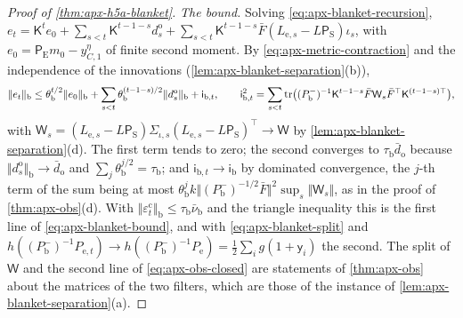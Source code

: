 \begin{proof}[Proof of \cref{thm:apx-h5a-blanket}]
\emph{The bound.} Solving \eqref{eq:apx-blanket-recursion}, $e_t=\mathsf K^te_0+\sum_{s<t}\mathsf K^{t-1-s}d^{\mathrm o}_s+\sum_{s<t}\mathsf K^{t-1-s}\bar F(L_{\mathrm e,s}-L\mathsf P_{\mathrm S})\iota_s$, with $e_0=\mathsf P_{\mathrm E}m_0-y^\eta_{C,1}$ of finite second moment. By \cref{eq:apx-metric-contraction} and the independence of the innovations (\cref{lem:apx-blanket-separation}(b)),
\begin{equation*}
\Vert e_t\Vert_{\mathrm b}\le\theta_{\mathrm b}^{t/2}\Vert e_0\Vert_{\mathrm b}+\sum_{s<t}\theta_{\mathrm b}^{(t-1-s)/2}\Vert d^{\mathrm o}_s\Vert_{\mathrm b}+\mathsf i_{\mathrm b,t},\qquad\mathsf i_{\mathrm b,t}^2=\sum_{s<t}\operatorname{tr}\bigl((P^-_{\mathrm b})^{-1}\mathsf K^{t-1-s}\bar F\mathsf W_s\bar F^\top\mathsf K^{(t-1-s)\top}\bigr),
\end{equation*}
with $\mathsf W_s=(L_{\mathrm e,s}-L\mathsf P_{\mathrm S})\Sigma_{\iota,s}(L_{\mathrm e,s}-L\mathsf P_{\mathrm S})^\top\to\mathsf W$ by \cref{lem:apx-blanket-separation}(d). The first term tends to zero; the second converges to $\tau_{\mathrm b}\bar d_{\mathrm o}$ because $\Vert d^{\mathrm o}_s\Vert_{\mathrm b}\to\bar d_{\mathrm o}$ and $\sum_j\theta_{\mathrm b}^{j/2}=\tau_{\mathrm b}$; and $\mathsf i_{\mathrm b,t}\to\mathsf i_{\mathrm b}$ by dominated convergence, the $j$-th term of the sum being at most $\theta_{\mathrm b}^jk\Vert(P^-_{\mathrm b})^{-1/2}\bar F\Vert^2\sup_s\Vert\mathsf W_s\Vert$, as in the proof of \cref{thm:apx-obs}(d). With $\Vert\varepsilon^{\mathrm c}_t\Vert_{\mathrm b}\le\tau_{\mathrm b}\bar\nu_{\mathrm b}$ and the triangle inequality this is the first line of \eqref{eq:apx-blanket-bound}, and with \eqref{eq:apx-blanket-split} and $h((P^-_{\mathrm b})^{-1}P_{\mathrm e,t})\to h((P^-_{\mathrm b})^{-1}P_{\mathrm e})=\frac12\sum_ig(1+\mathsf y_i)$ the second. The split of $\mathsf W$ and the second line of \eqref{eq:apx-obs-closed} are statements of \cref{thm:apx-obs} about the matrices of the two filters, which are those of the instance of \cref{lem:apx-blanket-separation}(a).


\end{proof}
